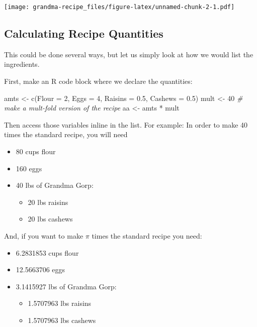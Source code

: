\documentclass[
]{article}
\newenvironment{Shaded}{\begin{snugshade}}{\end{snugshade}}
\newcommand{\AttributeTok}[1]{\textcolor[rgb]{0.77,0.63,0.00}{#1}}
\newcommand{\CommentTok}[1]{\textcolor[rgb]{0.56,0.35,0.01}{\textit{#1}}}
\newcommand{\DecValTok}[1]{\textcolor[rgb]{0.00,0.00,0.81}{#1}}
\newcommand{\FloatTok}[1]{\textcolor[rgb]{0.00,0.00,0.81}{#1}}
\newcommand{\FunctionTok}[1]{\textcolor[rgb]{0.00,0.00,0.00}{#1}}
\newcommand{\NormalTok}[1]{#1}
\newcommand{\OtherTok}[1]{\textcolor[rgb]{0.56,0.35,0.01}{#1}}
\newcommand{\SpecialCharTok}[1]{\textcolor[rgb]{0.00,0.00,0.00}{#1}}
\providecommand{\tightlist}{%
  \setlength{\itemsep}{0pt}\setlength{\parskip}{0pt}}
\begin{document}
\texttt{[image: grandma-recipe\_files/figure-latex/unnamed-chunk-2-1.pdf]}

\hypertarget{calc-quants}{%
\subsection{Calculating Recipe Quantities}\label{calc-quants}}

This could be done several ways, but let us simply look at how we would
list the ingredients.

First, make an R code block where we declare the quantities:

\begin{Shaded}
\begin{Highlighting}[]
\NormalTok{amts }\OtherTok{\textless{}{-}} \FunctionTok{c}\NormalTok{(}\AttributeTok{Flour =} \DecValTok{2}\NormalTok{, }\AttributeTok{Eggs =} \DecValTok{4}\NormalTok{, }\AttributeTok{Raisins =} \FloatTok{0.5}\NormalTok{, }\AttributeTok{Cashews =} \FloatTok{0.5}\NormalTok{)}
\NormalTok{mult }\OtherTok{\textless{}{-}} \DecValTok{40} \CommentTok{\# make a mult{-}fold version of the recipe}
\NormalTok{aa }\OtherTok{\textless{}{-}}\NormalTok{ amts }\SpecialCharTok{*}\NormalTok{ mult}
\end{Highlighting}
\end{Shaded}

Then access those variables inline in the list. For example: In order to
make 40 times the standard recipe, you will need

\begin{itemize}
\tightlist
\item
  80 cups flour
\item
  160 eggs
\item
  40 lbs of Grandma Gorp:

  \begin{itemize}
  \tightlist
  \item
    20 lbs raisins
  \item
    20 lbs cashews
  \end{itemize}
\end{itemize}

And, if you want to make \(\pi\) times the standard recipe you need:

\begin{itemize}
\tightlist
\item
  6.2831853 cups flour
\item
  12.5663706 eggs
\item
  3.1415927 lbs of Grandma Gorp:

  \begin{itemize}
  \tightlist
  \item
    1.5707963 lbs raisins
  \item
    1.5707963 lbs cashews
  \end{itemize}
\end{itemize}
\end{document}
